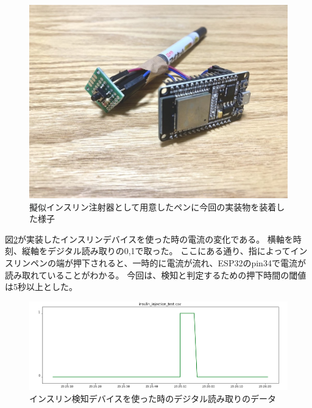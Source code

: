 \begin{figure}[htbp]
  \caption{擬似インスリン注射器として用意したペンに今回の実装物を装着した様子}
  \label{fig:pen_with_switch_n_esp32}
  \begin{center}
    \includegraphics[bb=0 0 1050 740,width=15cm]{assets/pen_with_switch_n_esp32.jpg}
  \end{center}
\end{figure}

図\ref{fig:insulin_injection_test}が実装したインスリンデバイスを使った時の電流の変化である。
横軸を時刻、縦軸をデジタル読み取りの0,1で取った。
ここにある通り、指によってインスリンペンの端が押下されると、一時的に電流が流れ、ESP32のpin34で電流が読み取れていることがわかる。
今回は、検知と判定するための押下時間の閾値は5秒以上とした。\cite{how_to_inject_insulin_1} \cite{how_to_inject_insulin_2}

\begin{figure}[htbp]
  \caption{インスリン検知デバイスを使った時のデジタル読み取りのデータ}
  \label{fig:insulin_injection_test}
  \begin{center}
    \includegraphics[bb=0 0 1000 350,width=17cm]{assets/insulin_injection_test.png}
  \end{center}
\end{figure}

